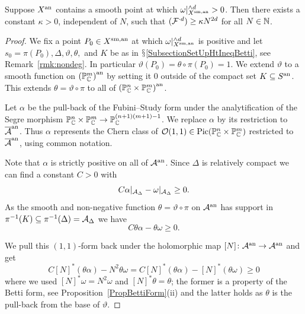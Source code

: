 \begin{proposition}
  \label{prop:intersectionlb}
  Suppose ${X}^{\mathrm{an}}$ contains a smooth point at which
  $\omega|_{{X}^{\mathrm{sm,an}}}^{\wedge d} >0$. Then there exists a constant $\kappa
  > 0$, independent of $N$, such that $({\mathcal F}^{\cdot d}) \ge \kappa N^{2d}$ for all
  $N\in{\mathbb{N}}$.   
\end{proposition}
\begin{proof}
We fix a point  $P_0 \in {X}^{\mathrm{sm,an}}$ at which
$\omega|_{{X}^{\mathrm{sm,an}}}^{\wedge d}$ is positive and let $s_0=\pi(P_0),\Delta,\vartheta,\theta,$
and $K$  be as in $\mathsection$\ref{SubsectionSetUpHtIneqBetti}, see 
Remark~\ref{rmk:nondeg}. In particular $\vartheta(P_0) = \theta\circ \pi(P_0) = 1$. 
We extend $\vartheta$ to a smooth function on  ${({\mathbb{P}}^m_{\mathbb{C}})}^{\mathrm{an}}$ by
setting it $0$ outside of the compact set $K\subseteq {S}^{\mathrm{an}}$. This
extends $\theta = \vartheta\circ\pi$ to all of
${({\mathbb{P}}^n_{\mathbb{C}}\times{\mathbb{P}}^m_{\mathbb{C}})}^{\mathrm{an}}$. 

Let $\alpha$ be the pull-back of the Fubini--Study form 
 under the analytification of the Segre morphism
${\mathbb{P}}_{{\mathbb{C}}}^n\times{\mathbb{P}}_{{\mathbb{C}}}^m \rightarrow {\mathbb{P}}_{{\mathbb{C}}}^{(n+1)(m+1)-1}$.
We replace $\alpha$ by its restriction to ${\overline{\mathcal{A}}}^{\mathrm{an}}$. 
Thus $\alpha$
represents the Chern class of
${\mathcal O}(1,1) \in \mathrm{Pic}({\mathbb{P}}^n_{{\mathbb{C}}}\times{\mathbb{P}}_{{\mathbb{C}}}^m)$ restricted
 to ${\overline{\mathcal{A}}}^{\mathrm{an}}$, using common notation.

Note that $\alpha$ is strictly positive on all of
${\mathcal{A}}^{\mathrm{an}}$.  Since $\Delta$ is relatively compact we can find a constant $C>0$
with
\begin{equation}\label{EqConditionOnCapitalC}
 C \alpha|_{\mathcal{A}_{\Delta}} - \omega|_{\mathcal{A}_{\Delta}} \ge 0.
\end{equation}
As the smooth and non-negative function $\theta = \vartheta\circ\pi$ on ${\mathcal{A}}^{\mathrm{an}}$ has support in
$\pi^{-1}(K)\subseteq \pi^{-1}(\Delta)=\mathcal{A}_{\Delta}$ we have
\begin{equation*}
  C \theta\alpha - \theta\omega \ge 0.
\end{equation*}

We pull this $(1,1)$-form back under the holomorphic map
$[N]\colon {\mathcal{A}}^{\mathrm{an}}\rightarrow{\mathcal{A}}^{\mathrm{an}}$ and get
\begin{equation}
\label{eq:pbsemipositive}
C  [N]^* (\theta\alpha) - N^2\theta\omega =  C [N]^*(\theta\alpha) - [N]^*(\theta\omega)\ge 0
\end{equation}
where we used $[N]^*\omega = N^2\omega$ and $[N]^* \theta = \theta$; 
the former is a property of the Betti form, see
Proposition~\ref{PropBettiForm}(ii) and
the latter holds as $\theta$ is the pull-back from the base of $\vartheta$.


\end{proof}

